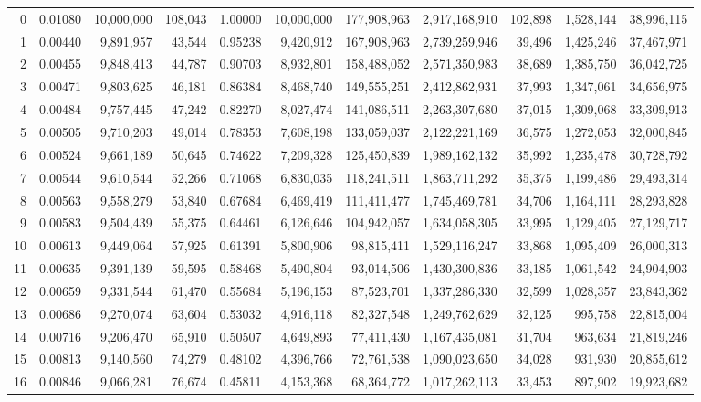 \begin{landscape}
\begin{longtable}{rrrrrrrrrrr}
0 & 0.01080 & 10,000,000 & 108,043 & 1.00000 & 10,000,000 & 177,908,963 & 2,917,168,910 & 102,898 & 1,528,144 & 38,996,115 \\
1 & 0.00440 & 9,891,957 & 43,544 & 0.95238 & 9,420,912 & 167,908,963 & 2,739,259,946 & 39,496 & 1,425,246 & 37,467,971 \\
2 & 0.00455 & 9,848,413 & 44,787 & 0.90703 & 8,932,801 & 158,488,052 & 2,571,350,983 & 38,689 & 1,385,750 & 36,042,725 \\
3 & 0.00471 & 9,803,625 & 46,181 & 0.86384 & 8,468,740 & 149,555,251 & 2,412,862,931 & 37,993 & 1,347,061 & 34,656,975 \\
4 & 0.00484 & 9,757,445 & 47,242 & 0.82270 & 8,027,474 & 141,086,511 & 2,263,307,680 & 37,015 & 1,309,068 & 33,309,913 \\
5 & 0.00505 & 9,710,203 & 49,014 & 0.78353 & 7,608,198 & 133,059,037 & 2,122,221,169 & 36,575 & 1,272,053 & 32,000,845 \\
6 & 0.00524 & 9,661,189 & 50,645 & 0.74622 & 7,209,328 & 125,450,839 & 1,989,162,132 & 35,992 & 1,235,478 & 30,728,792 \\
7 & 0.00544 & 9,610,544 & 52,266 & 0.71068 & 6,830,035 & 118,241,511 & 1,863,711,292 & 35,375 & 1,199,486 & 29,493,314 \\
8 & 0.00563 & 9,558,279 & 53,840 & 0.67684 & 6,469,419 & 111,411,477 & 1,745,469,781 & 34,706 & 1,164,111 & 28,293,828 \\
9 & 0.00583 & 9,504,439 & 55,375 & 0.64461 & 6,126,646 & 104,942,057 & 1,634,058,305 & 33,995 & 1,129,405 & 27,129,717 \\
10 & 0.00613 & 9,449,064 & 57,925 & 0.61391 & 5,800,906 & 98,815,411 & 1,529,116,247 & 33,868 & 1,095,409 & 26,000,313 \\
11 & 0.00635 & 9,391,139 & 59,595 & 0.58468 & 5,490,804 & 93,014,506 & 1,430,300,836 & 33,185 & 1,061,542 & 24,904,903 \\
12 & 0.00659 & 9,331,544 & 61,470 & 0.55684 & 5,196,153 & 87,523,701 & 1,337,286,330 & 32,599 & 1,028,357 & 23,843,362 \\
13 & 0.00686 & 9,270,074 & 63,604 & 0.53032 & 4,916,118 & 82,327,548 & 1,249,762,629 & 32,125 & 995,758 & 22,815,004 \\
14 & 0.00716 & 9,206,470 & 65,910 & 0.50507 & 4,649,893 & 77,411,430 & 1,167,435,081 & 31,704 & 963,634 & 21,819,246 \\
15 & 0.00813 & 9,140,560 & 74,279 & 0.48102 & 4,396,766 & 72,761,538 & 1,090,023,650 & 34,028 & 931,930 & 20,855,612 \\
16 & 0.00846 & 9,066,281 & 76,674 & 0.45811 & 4,153,368 & 68,364,772 & 1,017,262,113 & 33,453 & 897,902 & 19,923,682 \\

\end{longtable}
\end{landscape}
